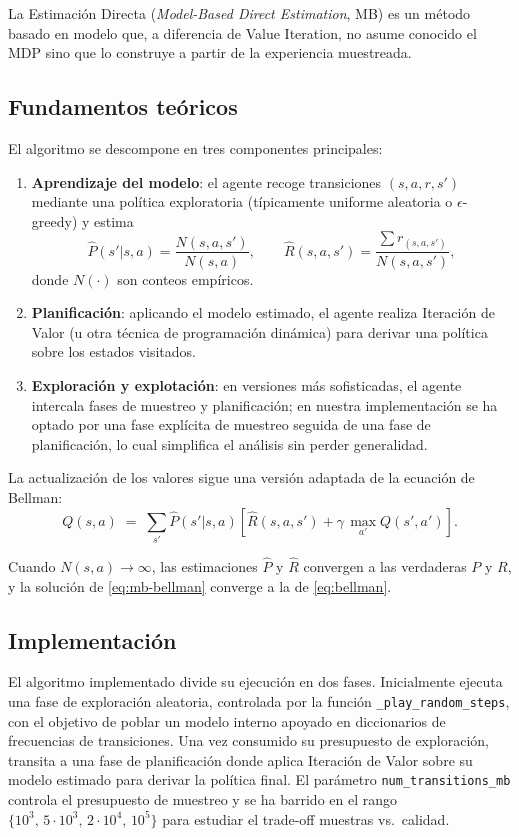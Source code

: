 \documentclass[11pt,a4paper]{article}
\begin{document}
La Estimación Directa (\emph{Model-Based Direct Estimation}, MB) es un método basado en modelo que, a diferencia de Value Iteration, no asume conocido el MDP sino que lo construye a partir de la experiencia muestreada.

\subsection{Fundamentos teóricos}

El algoritmo se descompone en tres componentes principales:
\begin{enumerate}
  \item \textbf{Aprendizaje del modelo}: el agente recoge transiciones $(s,a,r,s')$ mediante una política exploratoria (típicamente uniforme aleatoria o $\epsilon$-greedy) y estima
  $$\hat{P}(s'|s,a) = \frac{N(s,a,s')}{N(s,a)},\qquad \hat{R}(s,a,s') = \frac{\sum r_{(s,a,s')}}{N(s,a,s')},$$
  donde $N(\cdot)$ son conteos empíricos.
  \item \textbf{Planificación}: aplicando el modelo estimado, el agente realiza Iteración de Valor (u otra técnica de programación dinámica) para derivar una política sobre los estados visitados.
  \item \textbf{Exploración y explotación}: en versiones más sofisticadas, el agente intercala fases de muestreo y planificación; en nuestra implementación se ha optado por una fase explícita de muestreo seguida de una fase de planificación, lo cual simplifica el análisis sin perder generalidad.
\end{enumerate}

La actualización de los valores sigue una versión adaptada de la ecuación de Bellman:
\begin{equation}
  Q(s,a) \;=\; \sum_{s'} \hat{P}(s'|s,a)\!\left[\hat{R}(s,a,s') + \gamma\,\max_{a'} Q(s',a')\right].
  \label{eq:mb-bellman}
\end{equation}

Cuando $N(s,a)\to\infty$, las estimaciones $\hat{P}$ y $\hat{R}$ convergen a las verdaderas $P$ y $R$, y la solución de \eqref{eq:mb-bellman} converge a la de \eqref{eq:bellman}.

\subsection{Implementación}

El algoritmo implementado divide su ejecución en dos fases. Inicialmente ejecuta una fase de exploración aleatoria, controlada por la función \texttt{\_play\_random\_steps}, con el objetivo de poblar un modelo interno apoyado en diccionarios de frecuencias de transiciones. Una vez consumido su presupuesto de exploración, transita a una fase de planificación donde aplica Iteración de Valor sobre su modelo estimado para derivar la política final. El parámetro \texttt{num\_transitions\_mb} controla el presupuesto de muestreo y se ha barrido en el rango $\{10^3,\, 5\!\cdot\!10^3,\, 2\!\cdot\!10^4,\, 10^5\}$ para estudiar el trade-off muestras vs.\ calidad.
\end{document}
